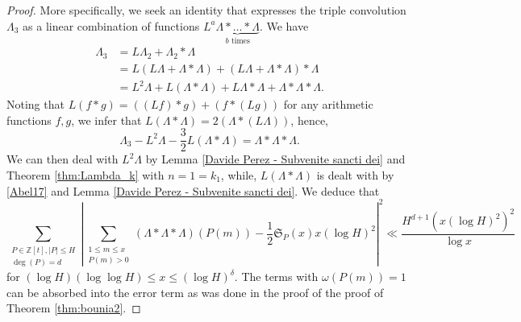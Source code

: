 \documentclass[reqno, 11pt]{amsart}
\numberwithin{equation}{section}
\theoremstyle{definition}
\newcommand{\0}{\mathbf{0}}
\renewcommand{\leq}{\leqslant}
\renewcommand{\P}{\mathbb{P}}
\renewcommand{\leq}{\leqslant}
\renewcommand{\#}{\sharp}
\begin{document}
\begin{proof}
More specifically, we seek an identity that expresses the triple convolution $\Lambda_3$ as
a linear combination of functions $L^a  \underbrace{\Lambda  \ast \dots \ast \Lambda}_{b \text{ times}}$. We have 
\begin{align*}
\Lambda_3
&= L \Lambda_2 + \Lambda_2\ast \Lambda
\\&=L (L \Lambda+ \Lambda\ast \Lambda) 
+ (L \Lambda+ \Lambda\ast \Lambda)  \ast \Lambda
\\ &=
L^2 \Lambda+ L (\Lambda\ast \Lambda  )
+L \Lambda\ast \Lambda +
\Lambda\ast \Lambda\ast \Lambda.
\end{align*}
Noting that $L (f \ast g )= ((Lf)\ast g)+  (f\ast (Lg))$
for any arithmetic functions $f,g$, we infer that 
$L(\Lambda \ast \Lambda)= 2 ( \Lambda \ast (L\Lambda))$,
hence, 
$$
\Lambda_3
-
L^2 \Lambda 
-\frac{3}{2}L( \Lambda\ast \Lambda )=
\Lambda\ast \Lambda\ast \Lambda.$$
We can then deal with $L^2 \Lambda$
by Lemma \ref{Davide Perez - Subvenite sancti dei}
and Theorem \ref{thm:Lambda_k}
with $n=1=k_1$, while, 
$L ( \Lambda\ast \Lambda )$ is dealt with by 
\eqref{Abel17} and Lemma \ref{Davide Perez - Subvenite sancti dei}. We deduce that $$\sum_{\substack{ P\in \mathbb Z[t],|P|\leq H \\  \deg(P)=d}} 
\left|
\sum_{\substack{1\leq m\leq x\\P(m)>0 } } 
(\Lambda \ast\Lambda \ast \Lambda)(P(m))
- \frac{1}{2}
\mathfrak S_{ P}(x) x  (\log H)^2
\right|^2  \ll  \frac{H^{d+1} (x (\log H)^2)^2} 
{\log x}$$ for $(\log H)(\log \log H) \leq x \leq (\log H)^\delta$. The terms with $\omega(P(m))=1$ can 
be absorbed into the error term as was done in the proof of the proof of  Theorem 
\ref{thm:bounia2}. 


\end{proof}
\end{document}
